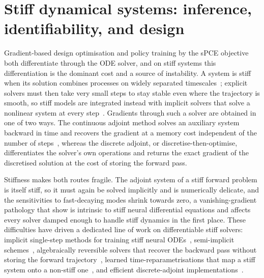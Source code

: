 \section{Stiff dynamical systems: inference, identifiability, and design}
\label{sec:rw-stiff}


Gradient-based design optimisation and policy training by the sPCE objective both differentiate
through the ODE solver, and on stiff systems this differentiation is the dominant cost and a
source of instability. A system is stiff when its solution combines processes on widely separated
timescales~\citep{curtiss1952integration}; explicit solvers must then take very small steps to
stay stable even where the trajectory is smooth, so stiff models are integrated instead with
implicit solvers that solve a nonlinear system at every step~\citep{hairer1996solving}. Gradients
through such a solver are obtained in one of two ways. The continuous adjoint method solves an
auxiliary system backward in time and recovers the gradient at a memory cost independent of the
number of steps~\citep{chen2018neural}, whereas the discrete adjoint, or discretise-then-optimise,
differentiates the solver's own operations and returns the exact gradient of the discretised
solution at the cost of storing the forward pass.

Stiffness makes both routes fragile. The adjoint system of a stiff forward problem is itself
stiff, so it must again be solved implicitly and is numerically delicate, and the sensitivities to
fast-decaying modes shrink towards zero, a vanishing-gradient pathology that
\citet{fronk2025vanishing} show is intrinsic to stiff neural differential equations and affects
every solver damped enough to handle stiff dynamics in the first place. These difficulties
have driven a dedicated line of work on differentiable
stiff solvers: implicit single-step methods for training stiff neural ODEs~\citep{fronk2024stiff},
semi-implicit schemes~\citep{aaai2025semiimplicit}, algebraically reversible solvers that recover
the backward pass without storing the forward trajectory~\citep{mccallum2024efficient}, learned
time-reparametrisations that map a stiff system onto a non-stiff one~\citep{caldana2025neural}, and
efficient discrete-adjoint implementations~\citep{pal2023neural}.

